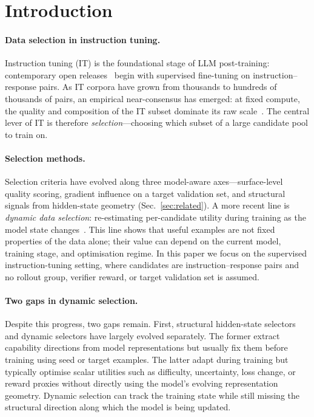 \section{Introduction}
\label{sec:intro}

\paragraph{Data selection in instruction tuning.}
Instruction tuning (IT) is the foundational stage of LLM
post-training: contemporary open releases~\cite{dubey2024llama3,
lambert2024tulu3,qwen2025} begin with supervised fine-tuning on
instruction--response pairs. As IT corpora have grown from
thousands to hundreds of thousands of pairs, an empirical
near-consensus has emerged: at fixed compute, the quality and
composition of the IT subset dominate its raw
scale~\cite{zhou2023lima,zhang2025jair, qin2024datatsunami}. The
central lever of IT is therefore \emph{selection}---choosing which
subset of a large candidate pool to train on.

\paragraph{Selection methods.}
Selection criteria have evolved along three model-aware
axes---surface-level quality scoring, gradient influence on a
target validation set, and structural signals from hidden-state
geometry (Sec.~\ref{sec:related}). A more recent line is
\emph{dynamic data selection}: re-estimating per-candidate utility
during training as the model state changes~\cite{kung2023activeit,
sun2025dots}. This line shows that useful examples are not fixed
properties of the data alone; their value can depend on the current
model, training stage, and optimisation regime. In this paper we
focus on the supervised instruction-tuning setting, where
candidates are instruction--response pairs and no rollout group,
verifier reward, or target validation set is assumed.

\paragraph{Two gaps in dynamic selection.}
Despite this progress, two gaps remain. First, structural
hidden-state selectors and dynamic selectors have largely evolved
separately. The former extract capability directions from model
representations but usually fix them before training using seed or
target examples. The latter adapt during training but typically
optimise scalar utilities such as difficulty, uncertainty, loss
change, or reward proxies without directly using the model's
evolving representation geometry. Dynamic selection can track the
training state while still missing the structural direction along
which the model is being updated.

